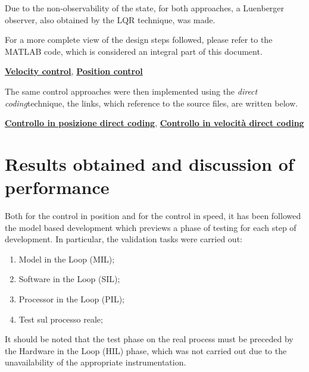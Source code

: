 \documentclass[11pt,a4paper,oneside]{extarticle}
\begin{document}
Due to the non-observability of the state, for both approaches, 
a Luenberger observer, also obtained by the LQR technique, was made.

For a more complete view of the design steps followed, please refer 
to the MATLAB code, which is considered an integral part of this 
document.

\begin{center}
	\href{https://github.com/favallone20/DigitalControlSystemDesignProject/blob/master/Speed_Feedback_MATLAB_Simulink/Speed_State_Feedback.mlx}{\textbf{Velocity control}}, \quad
	\href{https://github.com/favallone20/DigitalControlSystemDesignProject/blob/master/Position_State_Feedback_MATLAB_Simulink/Position_State_Feedback.mlx}{\textbf{Position control}} \bigskip
\end{center}
The same control approaches were then implemented using the 
\textit{direct coding}technique, the links, which reference to the source
files, are written below.

\begin{center}
	\href{https://github.com/favallone20/DigitalControlSystemDesignProject/tree/master/Position_State_Feedback_Direct_Coding}{\textbf{Controllo in posizione direct coding}}, \quad
	\href{https://github.com/favallone20/DigitalControlSystemDesignProject/tree/master/Speed_State_Feedback_Direct_Coding}{\textbf{Controllo in velocità direct coding}}
\end{center}

\section{Results obtained and discussion of performance}
Both for the control in position and for the control in speed, it has 
been followed the model based development which previews a 
phase of testing for each step of development. In particular, the 
validation tasks were carried out:

\begin{enumerate}
	\item Model in the Loop (MIL);
	\item Software in the Loop (SIL);
	\item Processor in the Loop (PIL);
	\item Test sul processo reale;
\end{enumerate}
It should be noted that the test phase on the real process must be 
preceded by the Hardware in the Loop (HIL) phase, which was not carried
 out due to the unavailability of the appropriate instrumentation.
\end{document}
